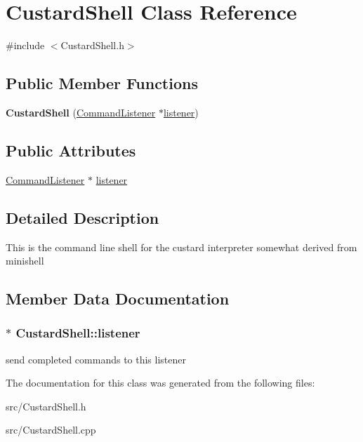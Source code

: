 \hypertarget{class_custard_shell}{
\section{\-Custard\-Shell \-Class \-Reference}
\label{class_custard_shell}
}


{\ttfamily \#include $<$\-Custard\-Shell.\-h$>$}

\subsection*{\-Public \-Member \-Functions}
\begin{DoxyCompactItemize}
\item 
\hypertarget{class_custard_shell_a33201a0ac6f77879ab01777755da347d}{
{\bfseries \-Custard\-Shell} (\hyperlink{class_command_listener}{\-Command\-Listener} $\ast$\hyperlink{class_custard_shell_acaa0978c4899db50944f00d5a9ce081b}{listener})}
\label{class_custard_shell_a33201a0ac6f77879ab01777755da347d}

\end{DoxyCompactItemize}
\subsection*{\-Public \-Attributes}
\begin{DoxyCompactItemize}
\item 
\hyperlink{class_command_listener}{\-Command\-Listener} $\ast$ \hyperlink{class_custard_shell_acaa0978c4899db50944f00d5a9ce081b}{listener}
\end{DoxyCompactItemize}


\subsection{\-Detailed \-Description}
\-This is the command line shell for the custard interpreter somewhat derived from minishell 

\subsection{\-Member \-Data \-Documentation}
\hypertarget{class_custard_shell_acaa0978c4899db50944f00d5a9ce081b}{
\subsubsection[{listener}]{$\ast$ {\bf \-Custard\-Shell\-::listener}}}
\label{class_custard_shell_acaa0978c4899db50944f00d5a9ce081b}
send completed commands to this listener 

\-The documentation for this class was generated from the following files\-:\begin{DoxyCompactItemize}
\item 
src/\-Custard\-Shell.\-h\item 
src/\-Custard\-Shell.\-cpp\end{DoxyCompactItemize}
